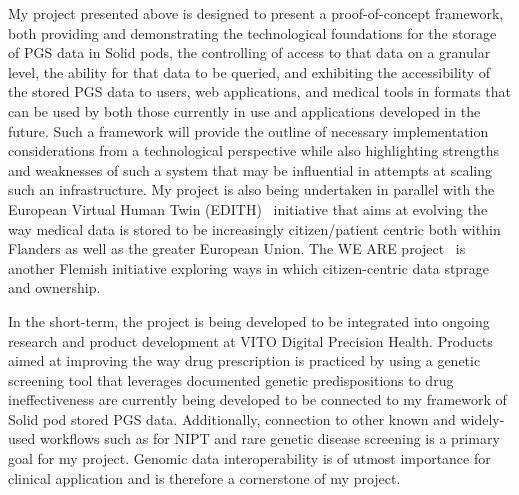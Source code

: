 \documentclass[a4paper,11pt]{article}
\begin{document}
\begin{refsection}
My project presented above is designed to present a proof-of-concept framework, both providing and demonstrating the technological foundations for the storage of PGS data in Solid pods, the controlling of access to that data on a granular level, the ability for that data to be queried, and exhibiting the accessibility of the stored PGS data to users, web applications, and medical tools in formats that can be used by both those currently in use and applications developed in the future. 
Such a framework will provide the outline of necessary implementation considerations from a technological perspective while also highlighting strengths and weaknesses of such a system that may be influential in attempts at scaling such an infrastructure. 
My project is also being undertaken in parallel with the European Virtual Human Twin (EDITH)~\cite{edith} initiative that aims at evolving the way medical data is stored to be increasingly citizen/patient centric both within Flanders as well as the greater European Union. 
The WE ARE project~\cite{we_are} is another Flemish initiative exploring ways in which citizen-centric data stprage and ownership.


In the short-term, the project is being developed to be integrated into ongoing research and product development at VITO Digital Precision Health. 
Products aimed at improving the way drug prescription is practiced by using a genetic screening tool that leverages documented genetic predispositions to drug ineffectiveness are currently being developed to be connected to my framework of Solid pod stored PGS data. 
Additionally, connection to other known and widely-used workflows such as for NIPT and rare genetic disease screening is a primary goal for my project. 
Genomic data interoperability is of utmost importance for clinical application and is therefore a cornerstone of my project. 


\end{refsection}
\end{document}
